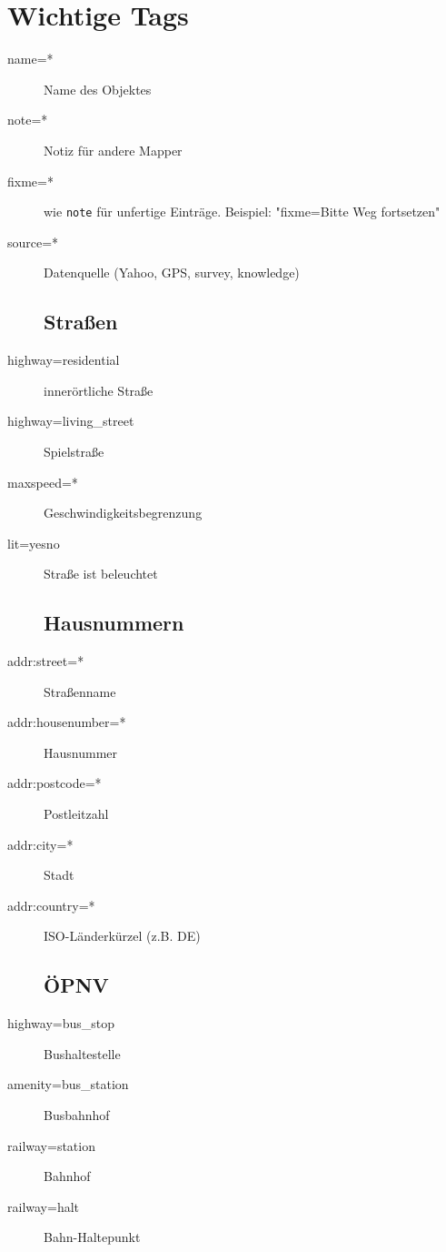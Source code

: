 \documentclass[a4paper,11pt,notumble]{leaflet}
\begin{document}
\section*{Wichtige Tags}
\begin{description}
\item[name=*] Name des Objektes
\item[note=*] Notiz für andere Mapper
\item[fixme=*] wie \texttt{note} für unfertige Einträge. 
Beispiel: "fixme=Bitte Weg fortsetzen"
\item[source=*] Datenquelle (Yahoo, GPS, survey, knowledge)
\subsection*{Straßen}
\item[highway=residential] innerörtliche Straße
\item[highway=living\_street] Spielstraße
\item[maxspeed=*] Geschwindigkeitsbegrenzung 
\item[lit=yes\textbar no] Straße ist beleuchtet
\subsection*{Hausnummern}
\item[addr:street=*] Straßenname
\item[addr:housenumber=*] Hausnummer 
\item[addr:postcode=*] Postleitzahl
\item[addr:city=*] Stadt
\item[addr:country=*] ISO-Länderkürzel (z.B. DE)
\subsection*{ÖPNV}
\item[highway=bus\_stop] Bushaltestelle
\item[amenity=bus\_station] Busbahnhof
\item[railway=station] Bahnhof
\item[railway=halt] Bahn-Haltepunkt

\end{description}
\end{document}
